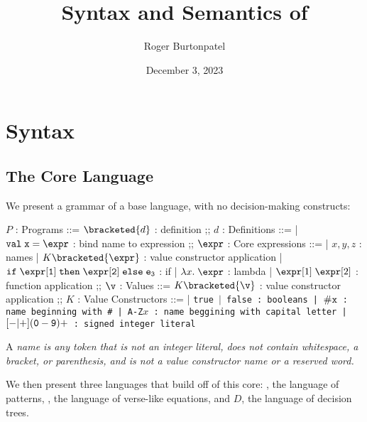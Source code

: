 \documentclass[]{article}
\title{Syntax and Semantics of {\VMinus}}
\author{Roger Burtonpatel}
\date{December 3, 2023}
\begin{document}
\maketitle

\section{Syntax}

\subsection{The Core Language}

We present a grammar of a base language, with no decision-making constructs: 

\bigskip

\begin{center}
    \begin{bnf}
    $P$ : \textsf{Programs} ::=
    $\bracketed{d}$ : definition
    ;;
    $d$ : \textsf{Definitions} ::=
    | $\tt{val}\; x\; \tt{=}\; \expr$ : bind name to expression
    ;;
    $\expr$ : Core expressions ::= 
    | $x, y, z$ : names
    | $K\bracketed{\expr}$ : value constructor application 
    | $\tt{if}\; \expr[1]\; \tt{then}\; \expr[2]\; \tt{else}\; e_{3} $ : if
    | $\lambda x.\; \expr$ : lambda 
    | $\expr[1]\; \expr[2]$ : function application 
    ;;
    $\v$ : Values ::= $K\bracketed{\v}$ : value constructor application 
    ;;
    $K$ : \textsf{Value Constructors} ::=
    | \tt{true} $\vert$ \tt{false} : booleans
    | $\tt{\#}x$ : name beginning with \tt{\#}
    | \tt{A-Z}$x$ : name beggining with capital letter
    | $[\tt{-}\vert\tt{+}](\tt{0}-\tt{9})+$ : signed integer literal 

    \end{bnf}
\end{center}


A \it{name} is any token that is not an integer literal, 
does not contain whitespace, a bracket, or parenthesis, 
and is not a value constructor name or a reserved word.


We then present three languages that build off of this core: 
{\PPlus}, the language of patterns, {\VMinus}, the language of 
verse-like equations, and $D$, the language of decision trees. 
\end{document}
